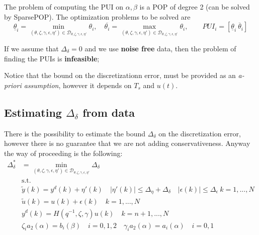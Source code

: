The problem of computing the PUI on $\alpha, \beta$ is a POP of degree 2 (can be solved by SparsePOP). The optimization problems to be solved are 
\begin{equation}
    \underline{\theta}_i=\min_{(\theta,\zeta,\gamma,\epsilon,\eta')\in\mathcal{D}_{\theta,\zeta,\gamma,\epsilon,\eta'}} \theta_i, \quad \overline{\theta_i}=\max_{(\theta,\zeta,\gamma,\epsilon,\eta')\in\mathcal{D}_{\theta,\zeta,\gamma,\epsilon,\eta'}} \theta_i, \qquad 
    PUI_i=[\underline{\theta}_i \ \overline{\theta}_i ]
\end{equation}

\begin{remark}
    If we assume that $\Delta_\delta=0$ and we use \textbf{noise free} data, then the problem of finding the PUIs is \textbf{infeasible}; 
\end{remark}

\begin{remark}
    Notice that the bound on the discretizationn error, must be provided as an \textit{a-priori assumption}, however it depends on $T_s$ and $u(t)$.
\end{remark}

\subsection{Estimating $\Delta_\delta$ from data}
There is the possibility to estimate the bound $\Delta_\delta$ on the discretization error, however there is no guarantee that we are not adding conservativeness. Anyway the way of proceeding is the following:
\begin{equation}
    \begin{aligned}
        \Delta_\delta^*&=\min_{(\theta,\zeta,\gamma,\epsilon,\eta')\in\mathcal{D}_{\theta,\zeta,\gamma,\epsilon,\eta'}} \Delta_\delta\\
        &\text{s.t.} \\
        &\tilde{y}(k)=y^d(k)+\eta'(k) \quad 
          \vert \eta'(k) \vert \le \Delta_\eta+\Delta_\delta \quad
        \vert \epsilon(k) \vert \le \Delta_\epsilon \ k=1,...,N\\
    &\tilde{u}(k)=u(k)+\epsilon(k) \quad k=1,...,N\\
    &y^d(k)=H(q^{-1},\zeta,\gamma)u(k) \quad 
    k=n+1,...,N\\
    &
    \zeta_i a_2(\alpha)=b_i(\beta) \quad i=0,1,2   \quad \gamma_i a_2(\alpha)=a_i(\alpha) \quad i=0,1
    \end{aligned}
\end{equation}

